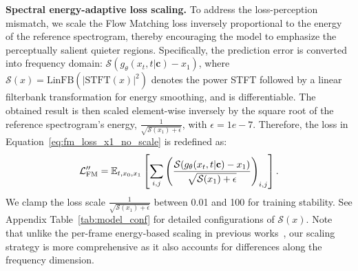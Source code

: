 \noindent\textbf{Spectral energy-adaptive loss scaling.} To address the loss-perception mismatch, we scale the Flow Matching loss inversely proportional to the energy of the reference spectrogram, thereby encouraging the model to emphasize the perceptually salient quieter regions. Specifically, the prediction error is converted into frequency domain: $\mathcal{S}(g_{\theta}(x_t, t|\mathbf{c}) - x_1)$, where $\mathcal{S}(x)=\mathrm{LinFB}(|\mathrm{STFT}(x)|^2)$ denotes the power STFT followed by a linear filterbank transformation for energy smoothing, and is differentiable. The obtained result is then scaled element-wise inversely by the square root of the reference spectrogram’s energy, $\frac{1}{\sqrt{\mathcal{S}(x_1) + \epsilon}}$, with $\epsilon=1e-7$. Therefore, the loss in Equation~\ref{eq:fm_loss_x1_no_scale} is redefined as:
\begin{equation}
\label{eq:fm_loss_x1_scaling}
\vspace{-0.2em}
\mathcal{L}_{\mathrm{FM}}''
= \mathbb{E}_{t,x_0,x_1} \left[ \sum_{i,j} 
\left(\frac{\mathcal{S}(g_{\theta}(x_t, t|\mathbf{c}) - x_1)}{\sqrt{\mathcal{S}(x_1) + \epsilon}}\right)_{i,j} \right].
\end{equation}
We clamp the loss scale $\frac{1}{\sqrt{\mathcal{S}(x_1) + \epsilon}}$ between 0.01 and 100 for training stability. See Appendix Table~\ref{tab:model_conf} for detailed configurations of $\mathcal{S}(x)$. 
Note that unlike the per-frame energy-based scaling in previous works~\citep{priorgrad,rfwave}, our scaling strategy is more comprehensive as it also accounts for differences along the frequency dimension.



